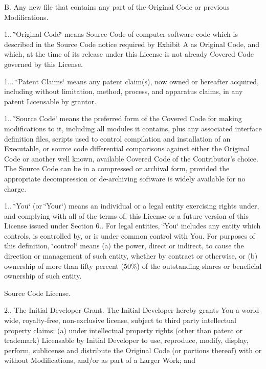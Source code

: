 \begin{DoxyEnumerate}
B. Any new file that contains any part of the Original Code or previous Modifications.

1.. \char`\"{}\-Original Code\char`\"{} means Source Code of computer software code which is described in the Source Code notice required by Exhibit A as Original Code, and which, at the time of its release under this License is not already Covered Code governed by this License.

1... \char`\"{}\-Patent Claims\char`\"{} means any patent claim(s), now owned or hereafter acquired, including without limitation, method, process, and apparatus claims, in any patent Licensable by grantor.

1.. \char`\"{}\-Source Code\char`\"{} means the preferred form of the Covered Code for making modifications to it, including all modules it contains, plus any associated interface definition files, scripts used to control compilation and installation of an Executable, or source code differential comparisons against either the Original Code or another well known, available Covered Code of the Contributor's choice. The Source Code can be in a compressed or archival form, provided the appropriate decompression or de-\/archiving software is widely available for no charge.

1.. \char`\"{}\-You\char`\"{} (or \char`\"{}\-Your\char`\"{}) means an individual or a legal entity exercising rights under, and complying with all of the terms of, this License or a future version of this License issued under Section 6.. For legal entities, \char`\"{}\-You\char`\"{} includes any entity which controls, is controlled by, or is under common control with You. For purposes of this definition, \char`\"{}control\char`\"{} means (a) the power, direct or indirect, to cause the direction or management of such entity, whether by contract or otherwise, or (b) ownership of more than fifty percent (50\%) of the outstanding shares or beneficial ownership of such entity.
\item Source Code License.

2.. The Initial Developer Grant. The Initial Developer hereby grants You a world-\/wide, royalty-\/free, non-\/exclusive license, subject to third party intellectual property claims\-: (a) under intellectual property rights (other than patent or trademark) Licensable by Initial Developer to use, reproduce, modify, display, perform, sublicense and distribute the Original Code (or portions thereof) with or without Modifications, and/or as part of a Larger Work; and


\end{DoxyEnumerate}

